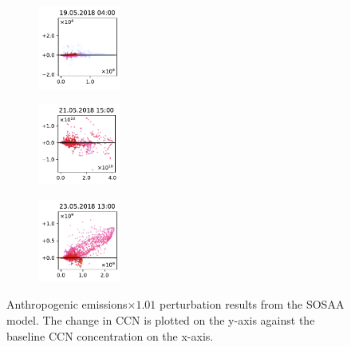 \begin{figure}[H]
    \begin{subfigure}
        \centering
        \includegraphics[width=0.30\textwidth,valign=t]{evaluation/figures/perturbations/perturbation-19.05.2018:04.00-anthropogenic-mul-1.01.pdf}
    \end{subfigure}
    \begin{subfigure}
        \centering
        \includegraphics[width=0.30\textwidth,valign=t]{evaluation/figures/perturbations/perturbation-21.05.2018:15.00-anthropogenic-mul-1.01.pdf}
    \end{subfigure}
    \begin{subfigure}
        \centering
        \includegraphics[width=0.30\textwidth,valign=t]{evaluation/figures/perturbations/perturbation-23.05.2018:13.00-anthropogenic-mul-1.01.pdf}
    \end{subfigure}

    \caption[Anthropogenic emissions$\times 1.01$ perturbation SOSAA results]{Anthropogenic emissions$\times 1.01$ perturbation results from the SOSAA model. The change in CCN is plotted on the y-axis against the baseline CCN concentration on the x-axis.}
    \label{fig:sosaa-perturbation-anthropogenic-mul-1.01}
\end{figure}

